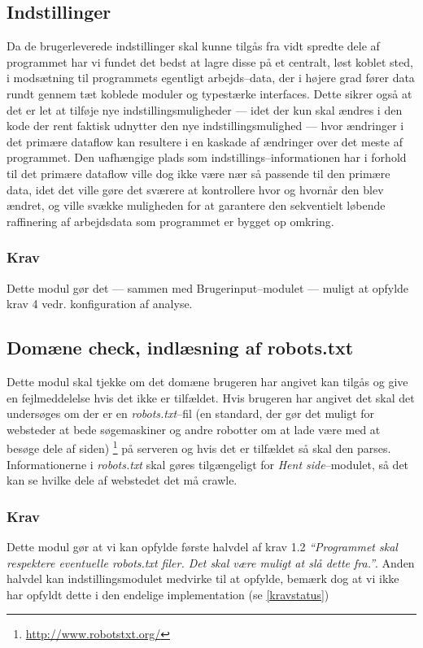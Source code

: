 \documentclass[a4paper,oneside]{memoir}
\begin{document}
\subsection{Indstillinger}
Da de brugerleverede indstillinger skal kunne tilgås fra vidt spredte
dele af programmet har vi fundet det bedst at lagre disse på et
centralt, løst koblet sted, i modsætning til programmets egentligt
arbejds--data, der i højere grad fører data rundt gennem tæt koblede
moduler og typestærke interfaces. Dette sikrer også at det er let at
tilføje nye indstillingsmuligheder --- idet der kun skal ændres i den
kode der rent faktisk udnytter den nye indstillingsmulighed --- hvor
ændringer i det primære dataflow kan resultere i en kaskade af
ændringer over det meste af programmet. Den uafhængige plads som
indstillings--informationen har i forhold til det primære dataflow
ville dog ikke være nær så passende til den primære data, idet det
ville gøre det sværere at kontrollere hvor og hvornår den blev ændret,
og ville svække muligheden for at garantere den sekventielt løbende
raffinering af arbejdsdata som programmet er bygget op omkring.

\subsubsection*{Krav}
Dette modul gør det --- sammen med Brugerinput--modulet --- muligt at
opfylde krav 4 vedr. konfiguration af analyse.

\subsection{Domæne check, indlæsning af robots.txt}
Dette modul skal tjekke om det domæne brugeren har angivet kan tilgås
og give en fejlmeddelelse hvis det ikke er tilfældet. Hvis brugeren
har angivet det skal det undersøges om der er en
\textit{robots.txt}--fil (en standard, der gør det muligt for websteder
at bede søgemaskiner og andre robotter om at lade være med at besøge
dele af siden) \footnote{\url{http://www.robotstxt.org/}} på serveren
og hvis det er tilfældet så skal den parses. Informationerne i
\textit{robots.txt} skal gøres tilgængeligt for \textit{Hent
  side}--modulet, så det kan se hvilke dele af webstedet det må crawle.

\subsubsection*{Krav}
Dette modul gør at vi kan opfylde første halvdel af krav 1.2
\textit{``Programmet skal respektere eventuelle robots.txt filer. Det
  skal være muligt at slå dette fra.''}. Anden halvdel kan
indstillingsmodulet medvirke til at opfylde, bemærk dog at vi ikke har
opfyldt dette i den endelige implementation (se \ref{kravstatus})
\end{document}

